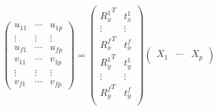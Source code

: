 \begin{equation}\label{eq:orthogonalMeasurementMatrix}
\begin{pmatrix}
u_{11}& \cdots & u_{1p}\\
\vdots& \vdots &\vdots\\
u_{f1}& \cdots & u_{fp}\\
v_{11}& \cdots & v_{1p}\\
\vdots& \vdots &\vdots\\
v_{f1}& \cdots & v_{fp}
\end{pmatrix}
=
\begin{pmatrix}
{R_x^1}^T & t_x^1\\
\vdots & \vdots\\
{R_x^f}^T & t_x^f\\
{R_y^1}^T & t_y^1\\
\vdots & \vdots\\
{R_y^f}^T & t_y^f\\
\end{pmatrix}
\begin{pmatrix}
X_1&\cdots &X_p
\end{pmatrix}
\end{equation}


